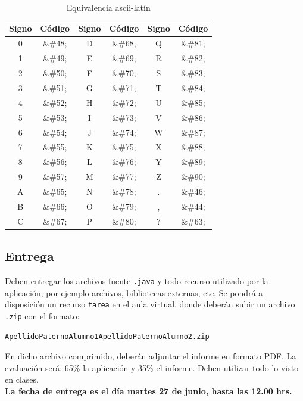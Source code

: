\documentclass[a4paper,10pt]{article}
\theoremstyle{mytheor}
\begin{document}
\begin{table}[H]
    \begin{center}
        \caption{Equivalencia ascii-lat\'in}\label{tab:t2}
        \begin{tabular}{|c|c|c|c|c|c|} \hline
            \textbf{Signo} & \textbf{C\'odigo} & \textbf{Signo} & \textbf{C\'odigo} & \textbf{Signo} & \textbf{C\'odigo} \\ \hline
            0&\&\#48;	& D&\&\#68; & Q&\&\#81;	 \\ \hline
            1&\&\#49;	& E&\&\#69; & R&\&\#82;	 \\ \hline
            2&\&\#50;	& F&\&\#70; & S&\&\#83;	\\\hline
            3&\&\#51;	& G&\&\#71; & T&\&\#84;	 \\\hline
            4&\&\#52;	& H&\&\#72; & U&\&\#85;	 \\\hline
            5&\&\#53;	& I&\&\#73; & V&\&\#86;	 \\\hline
            6&\&\#54;	& J&\&\#74; & W&\&\#87;	\\\hline
            7&\&\#55;	& K&\&\#75; & X&\&\#88;	 \\\hline
            8&\&\#56;	& L&\&\#76; & Y&\&\#89;  \\\hline
            9&\&\#57;	& M&\&\#77; & Z&\&\#90;	 \\\hline
            A&\&\#65;	& N&\&\#78; & . &\&\#46;	 \\\hline
            B&\&\#66;	& O&\&\#79; & , &\&\#44;	 \\\hline
            C&\&\#67; & P&\&\#80; & ? &\&\#63;	 \\ \hline
		\end{tabular}
    \end{center}
\end{table}

\subsection{Entrega}

Deben entregar los archivos fuente \texttt{.java} y todo recurso utilizado por la aplicaci\'on, por ejemplo archivos, bibliotecas externas, etc. Se pondr\'a a disposici\'on un recurso \texttt{tarea} en el aula virtual, donde deber\'an subir un archivo \texttt{.zip} con el formato:

\begin{center}
\texttt{ApellidoPaternoAlumno1ApellidoPaternoAlumno2.zip}
\end{center}

\noindent
En dicho archivo comprimido, deber\'an adjuntar el informe en formato PDF. La evaluaci\'on ser\'a: 65\% la aplicaci\'on y 35\% el informe. Deben utilizar todo lo visto en clases.\\

\noindent
\textbf{La fecha de entrega es el d\'ia martes 27 de junio, hasta las 12.00 hrs.}
\end{document}
